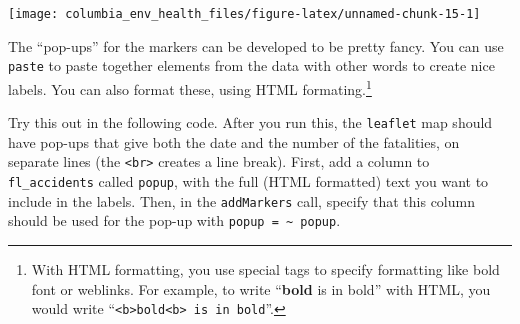 \documentclass[]{tufte-book}
\newenvironment{Shaded}{}{}
\newcommand{\DataTypeTok}[1]{\textcolor[rgb]{0.56,0.13,0.00}{#1}}
\newcommand{\DecValTok}[1]{\textcolor[rgb]{0.25,0.63,0.44}{#1}}
\newcommand{\FloatTok}[1]{\textcolor[rgb]{0.25,0.63,0.44}{#1}}
\newcommand{\KeywordTok}[1]{\textcolor[rgb]{0.00,0.44,0.13}{\textbf{#1}}}
\newcommand{\NormalTok}[1]{#1}
\newcommand{\OperatorTok}[1]{\textcolor[rgb]{0.40,0.40,0.40}{#1}}
\newcommand{\StringTok}[1]{\textcolor[rgb]{0.25,0.44,0.63}{#1}}
\begin{document}
\begin{Shaded}
\end{Shaded}

\texttt{[image: columbia\_env\_health\_files/figure-latex/unnamed-chunk-15-1]}

The ``pop-ups'' for the markers can be developed to be pretty fancy. You can use \texttt{paste} to paste
together elements from the data with other words to create nice labels. You can also format these, using
HTML formating.\footnote{With HTML formatting, you use special tags to specify formatting like bold font
  or weblinks. For example, to write ``\textbf{bold} is in bold'' with HTML, you would write
  ``\texttt{\textless{}b\textgreater{}bold\textless{}b\textgreater{}\ is\ in\ bold}''.}

Try this out in the following code. After you run this, the \texttt{leaflet} map should have pop-ups that
give both the date and the number of the fatalities, on separate lines (the \texttt{\textless{}br\textgreater{}} creates a line
break). First, add a column to \texttt{fl\_accidents} called \texttt{popup}, with the full (HTML formatted) text
you want to include in the labels. Then, in the \texttt{addMarkers} call, specify that this column should
be used for the pop-up with \texttt{popup\ =\ \textasciitilde{}\ popup}.
\end{document}
